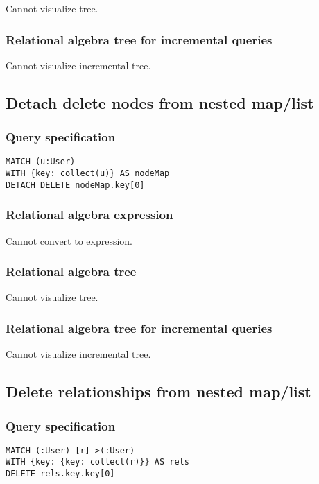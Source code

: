 Cannot visualize tree.

\subsubsection*{Relational algebra tree for incremental queries}

Cannot visualize incremental tree.

\subsection{Detach delete nodes from nested map/list}

\subsubsection*{Query specification}

\begin{lstlisting}
MATCH (u:User)
WITH {key: collect(u)} AS nodeMap
DETACH DELETE nodeMap.key[0]
\end{lstlisting}

\subsubsection*{Relational algebra expression}

Cannot convert to expression.

\subsubsection*{Relational algebra tree}

Cannot visualize tree.

\subsubsection*{Relational algebra tree for incremental queries}

Cannot visualize incremental tree.

\subsection{Delete relationships from nested map/list}

\subsubsection*{Query specification}

\begin{lstlisting}
MATCH (:User)-[r]->(:User)
WITH {key: {key: collect(r)}} AS rels
DELETE rels.key.key[0]
\end{lstlisting}

